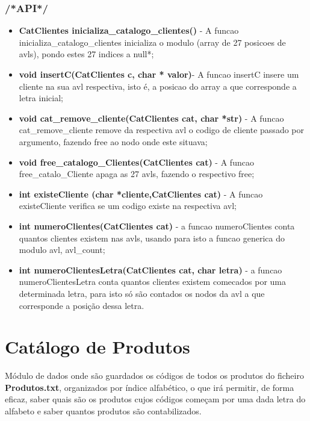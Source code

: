 \subsubsection{/*API*/}
\begin{itemize}

\item \textbf{CatClientes inicializa\_catalogo\_clientes()} - A funcao inicializa\_catalogo\_clientes inicializa o modulo (array de 27 posicoes de avls), pondo estes 27 indices a null*; 

\item \textbf{void insertC(CatClientes c, char * valor)}- A funcao insertC insere um cliente na sua avl respectiva, isto é, a posicao do array a que corresponde a letra inicial; 

\item \textbf{void cat\_remove\_cliente(CatClientes cat, char *str)} - A funcao cat\_remove\_cliente remove da respectiva avl o codigo de cliente passado por argumento, fazendo free ao nodo onde este situava; 

\item \textbf{void free\_catalogo\_Clientes(CatClientes cat)} - A funcao free\_catalo\_Cliente apaga as 27 avls, fazendo o respectivo free; 

\item \textbf{int existeCliente (char *cliente,CatClientes cat)} - A funcao existeCliente verifica se um codigo existe na respectiva avl;

\item \textbf{int numeroClientes(CatClientes cat)} - a funcao numeroClientes conta quantos clientes existem nas avls, usando para isto a funcao generica do modulo avl, avl\_count;

\item \textbf{int numeroClientesLetra(CatClientes cat, char letra)} - a funcao numeroClientesLetra conta quantos clientes existem comecados por uma determinada letra, para isto só são contados os nodos da avl a que corresponde a posição dessa letra. 

\end{itemize}

\section{Catálogo de Produtos}

 Módulo de dados onde são guardados os códigos de todos os produtos do ficheiro \textbf{Produtos.txt}, organizados por índice alfabético, o que irá permitir, de forma eficaz, saber quais são os produtos cujos códigos começam por uma dada letra do alfabeto e saber quantos produtos são contabilizados. 


